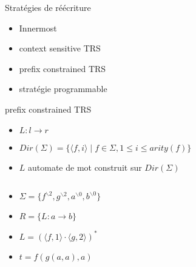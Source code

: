\begin{frame}{Stratégies de réécriture}
  \begin{itemize}
  \item Innermost
  \item context sensitive TRS
  \item prefix constrained TRS
  \item stratégie programmable
  \end{itemize}
\end{frame}

\begin{frame}{prefix constrained TRS}
  \begin{itemize}
  \item $L : l \rightarrow r$
  \item $Dir(\Sigma) = \{\langle f, i \rangle \mid f \in \Sigma, 1 \leq i \leq arity(f)\}$
  \item $L$ automate de mot construit sur $Dir(\Sigma)$
  \end{itemize}
  \begin{example}
    \begin{columns}
      \begin{column}{0.5\textwidth}
        \begin{itemize}
        \item $\Sigma = \{f^{\backslash 2}, g^{\backslash 2}, a^{\backslash 0}, b^{\backslash 0}\}$
        \item $R = \{L : a \rightarrow b\}$
        \item $L  = (\langle f,1 \rangle \cdot \langle g, 2 \rangle)^*$
        \item $t = f(g(a,a),a)$
        \end{itemize}
      \end{column}
      \begin{column}{0.5\textwidth}
        \begin{overprint}
        \end{overprint}
      \end{column}
    \end{columns}
  \end{example}
\end{frame}

